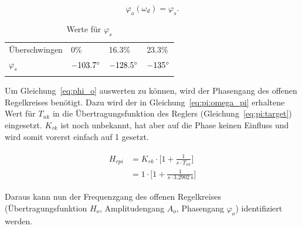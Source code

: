 
\begin{equation} \label{eq:phi_o}
    \varphi_o(\omega_d)=\varphi_s.
\end{equation}

\begin{longtable}{llll}
    \toprule
    \endhead
    \endfoot
    \endlastfoot


    \"Uberschwingen & 0\%              & 16.3\%           & 23.3\% \\
    $\varphi_s$        & $-103.7 \degree$ & $-128.5 \degree$ & $-135 \degree$ \\

    \bottomrule
    \caption{Werte f\"ur $\varphi_s$}
    \label{tab:phi_s}
\end{longtable}

Um    Gleichung~\ref{eq:phi_o}    auswerten     zu    k\"onnen,    wird    der
Phasengang   des   offenen   Regelkreises   ben\"otigt. Dazu   wird   der   in
Gleichung~\ref{eq:pi:omega_pi}    erhaltene    Wert    f\"ur    $T_{nk}$    in
die   \"Ubertragungsfunktion    des   Reglers   (Gleichung~\ref{eq:pi:target})
eingesetzt. $K_{rk}$  ist  noch  unbekannt,  hat aber  auf  die  Phase  keinen
Einfluss und wird somit vorerst einfach auf 1 gesetzt.

\begin{gather} \label{eq:pi:target:inserted}
    \begin{split}
        H_{rpi} & = K_{rk} \cdot \biggl[ 1 + \frac{1}{s \cdot T_{nk}} \biggr] \\
                & = 1      \cdot \biggl[ 1 + \frac{1}{s \cdot \SI{3.2902}{\second}} \biggr]
    \end{split}
\end{gather}

Daraus    kann    nun    der    Frequenzgang    des    offenen    Regelkreises
(\"Ubertragungsfunktion $H_o$,  Amplitudengang $A_o$,  Phasengang $\varphi_o$)
identifiziert werden.


